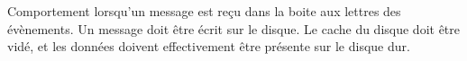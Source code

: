 {Comportement lorsqu'un message est reçu dans la boite aux lettres des évènements.}
{Un message doit être écrit sur le disque. Le cache du disque doit être vidé, et
les données doivent effectivement être présente sur le disque dur.}
